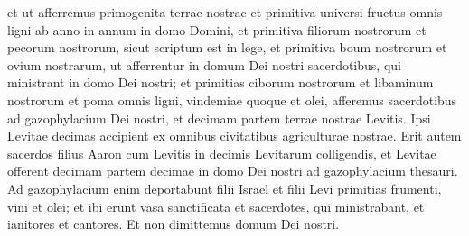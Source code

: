 \begin{biblechapter}
\begin{biblechapter}
\begin{biblechapter}
\begin{biblechapter}
\begin{biblechapter}
\begin{biblechapter}
\begin{biblechapter}
\begin{biblechapter}
\begin{biblechapter}
\begin{biblechapter}
\verse et ut afferremus primogenita terrae nostrae et primitiva universi fructus omnis ligni ab anno in annum in domo Domini, 
\verse et primitiva filiorum nostrorum et pecorum nostrorum, sicut scriptum est in lege, et primitiva boum nostrorum et ovium nostrarum, ut afferrentur in domum Dei nostri sacerdotibus, qui ministrant in domo Dei nostri; 
 \verse et primitias ciborum nostrorum et libaminum nostrorum et poma omnis ligni, vindemiae quoque et olei, afferemus sacerdotibus ad gazophylacium Dei nostri, et decimam partem terrae nostrae Levitis. Ipsi Levitae decimas accipient ex omnibus civitatibus agriculturae nostrae.
 \verse Erit autem sacerdos filius Aaron cum Levitis in decimis Levitarum colligendis, et Levitae offerent decimam partem decimae in domo Dei nostri ad gazophylacium thesauri. 
\verse Ad gazophylacium enim deportabunt filii Israel et filii Levi primitias frumenti, vini et olei; et ibi erunt vasa sanctificata et sacerdotes, qui ministrabant, et ianitores et cantores. Et non dimittemus domum Dei nostri.
 

\end{biblechapter}
\end{biblechapter}
\end{biblechapter}
\end{biblechapter}
\end{biblechapter}
\end{biblechapter}
\end{biblechapter}
\end{biblechapter}
\end{biblechapter}
\end{biblechapter}
